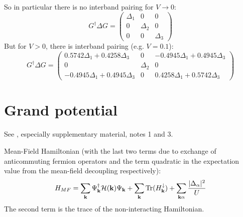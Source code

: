 \documentclass[../main.tex]{subfiles}
\begin{document}
So in particular there is no interband pairing for \(V \to 0\):
\begin{equation}
	G^{\dagger} \Delta G =
	\begin{pmatrix}
		\Delta_1 & 0 & 0 \\
		0 & \Delta_{2} & 0 \\
		0 & 0 & \Delta_3
	\end{pmatrix}
\end{equation}
But for \(V > 0\), there is interband pairing (e.g. \(V = 0.1\)):
\begin{equation}
	G^{\dagger} \Delta G =
	\begin{pmatrix}
		0.5742 \Delta_{1} + 0.4258 \Delta_{3} & 0 & - 0.4945 \Delta_{1} + 0.4945 \Delta_{3} \\
		0 & \Delta_{2} & 0 \\
		- 0.4945 \Delta_{1} + 0.4945 \Delta_{3} & 0 & 0.4258 \Delta_{1} + 0.5742 \Delta_{3}
	\end{pmatrix}
\end{equation}

\section{Grand potential}

See \cite{peottaSuperfluidityTopologicallyNontrivial2015}, especially supplementary material, notes 1 and 3.

Mean-Field Hamiltonian (with the last two terms due to exchange of anticommuting fermion operators and the term quadratic in the expectation value from the mean-field decoupling respectively):
\begin{equation}
	H_{MF} = \sum_{\bm{\mathrm{k}}} \Psi_{\bm{\mathrm{k}}}^{\dagger} \mathcal{H} (\bm{\mathrm{k}}) \Psi_{\bm{\mathrm{k}}} + \sum_{\bm{\mathrm{k}}} \operatorname{Tr}(H^{\downarrow}_{\bm{\mathrm{k}}}) + \sum_{\bm{\mathrm{k}} \alpha} \frac{\vert \Delta_{\alpha} \vert^2}{U}
\end{equation}
The second term is the trace of the non-interacting Hamiltonian.
\end{document}
